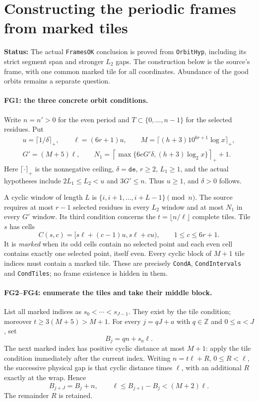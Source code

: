 \documentclass[11pt,a4paper]{article}
\numberwithin{equation}{section}
\theoremstyle{remark}\newtheorem{remark}[theorem]{Remark}
\newcommand{\status}[1]{\textbf{Status:} #1}
\begin{document}
\section{Constructing the periodic frames from marked tiles}
\label{sec:frame-geometry}

\status{The actual \texttt{FramesOK} conclusion is proved from
\texttt{OrbitHyp}, including its strict segment span and stronger $L_2$
gaps. The construction below is the source's frame, with one common
marked tile for all coordinates. Abundance of the good orbits remains
a separate question.}

\paragraph{FG1: the three concrete orbit conditions.}
Write $n=n'>0$ for the even period and
$T\subset\{0,\ldots,n-1\}$ for the selected residues. Put
\[
\begin{gathered}
 u=\lceil1/\delta\rceil_+,\qquad \ell=(6r+1)u,\qquad
 M=\lceil(h+3)10^{6r+1}\log x\rceil_+,\\
 G'=(M+5)\ell,\qquad
 N_1=\left\lceil\max\{6eG'\delta,(h+3)\log_2x\}\right\rceil_++1 .
\end{gathered}                                                    \tag{FG.1}
\]
Here $\lceil\cdot\rceil_+$ is the nonnegative ceiling, $\delta=\texttt{de}$,
$r\ge2$, $L_1\ge1$, and the actual hypotheses include
$2L_1\le L_2<u$ and $3G'\le n$. Thus $u\ge1$, and $\delta>0$ follows.

A cyclic window of length $L$ is
$\{i,i+1,\ldots,i+L-1\}\pmod n$. The source requires at most $r-1$
selected residues in every $L_2$ window and at most $N_1$ in every $G'$
window. Its third condition concerns the $t=\lfloor n/\ell\rfloor$
complete tiles. Tile $s$ has cells
\[
 C(s,c)=[s\ell+(c-1)u,s\ell+cu),\qquad 1\le c\le6r+1.
\]
It is \emph{marked} when its odd cells contain no selected point and
each even cell contains exactly one selected point, itself even.
Every cyclic block of $M+1$ tile indices must contain a marked tile.
These are precisely \texttt{CondA}, \texttt{CondIntervals} and
\texttt{CondTiles}; no frame existence is hidden in them.

\paragraph{FG2--FG4: enumerate the tiles and take their middle block.}
List all marked indices as $s_0<\cdots<s_{J-1}$.
They exist by the tile condition; moreover $t\ge3(M+5)>M+1$.
For every $j=qJ+a$ with $q\in\mathbb Z$ and $0\le a<J$, set
\[
 B_j=qn+s_a\ell.
\]
The next marked index has positive cyclic distance at most $M+1$:
apply the tile condition immediately after the current index.
Writing $n=t\ell+R$, $0\le R<\ell$, the successive physical gap is
that cyclic distance times $\ell$, with an additional $R$ exactly
at the wrap. Hence
\[
 B_{j+J}=B_j+n,\qquad
 \ell\le B_{j+1}-B_j<(M+2)\ell.                         \tag{FG.2}
\]
The remainder $R$ is retained.
\end{document}
